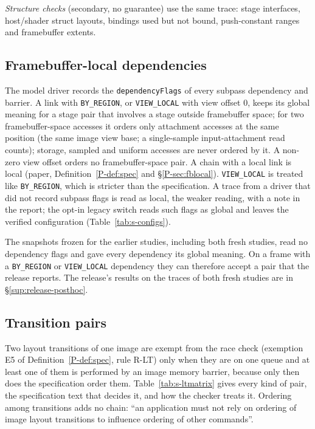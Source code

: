 \documentclass[acmtog,anonymous,review]{acmart}
\newcommand{\code}[1]{\texttt{#1}}
\begin{document}
\emph{Structure checks} (secondary, no guarantee) use the same trace: stage interfaces, host/shader struct layouts,
bindings used but not bound, push-constant ranges and framebuffer extents.

\subsection{Framebuffer-local dependencies}
\label{sup:fblocal}
The model driver records the \code{dependencyFlags} of every subpass dependency and barrier. A link with
\code{BY\_REGION}, or \code{VIEW\_LOCAL} with view offset 0, keeps its global meaning for a stage pair that involves a
stage outside framebuffer space; for two framebuffer-space accesses it orders only attachment accesses at the same
position (the same image view base; a single-sample input-attachment read counts); storage, sampled and uniform
accesses are never ordered by it. A non-zero view offset orders no framebuffer-space pair. A chain with a local link is
local (paper, Definition~\ref{P-def:spec} and \S\ref{P-sec:fblocal}). \code{VIEW\_LOCAL} is treated like
\code{BY\_REGION}, which is stricter than the specification. A trace from a driver that did not record subpass flags is
read as local, the weaker reading, with a note in the report; the opt-in legacy switch reads such flags as global and
leaves the verified configuration (Table~\ref{tab:s-configs}).

The snapshots frozen for the earlier studies, including both fresh studies, read no dependency flags and gave every
dependency its global meaning. On a frame with a \code{BY\_REGION} or \code{VIEW\_LOCAL} dependency they can therefore
accept a pair that the release reports. The
release's results on the traces of both fresh studies are in \S\ref{sup:release-posthoc}.

\subsection{Transition pairs}
\label{sup:ltpairs}
Two layout transitions of one image are exempt from the race check (exemption E5 of Definition~\ref{P-def:spec}, rule
R-LT) only when they are on one queue and at least one of them is performed by an image memory barrier, because only
then does the specification order them. Table~\ref{tab:s-ltmatrix} gives every kind of pair, the specification text
that decides it, and how the checker treats it. Ordering among transitions adds no chain: ``an application must not
rely on ordering of image layout transitions to influence ordering of other commands''.
\end{document}
